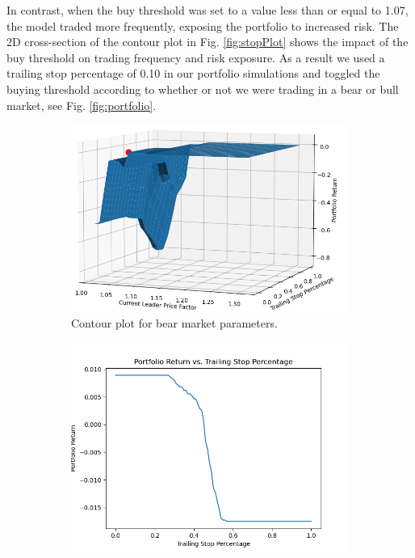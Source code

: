 \documentclass{article}
\begin{document}
In contrast, when the buy threshold was set to a value less than or equal to 1.07, the model traded more frequently, exposing the portfolio to increased risk. The 2D cross-section of the contour plot in Fig. \ref{fig:stopPlot} shows the impact of the buy threshold on trading frequency and risk exposure. As a result we used a trailing stop percentage of 0.10 in our portfolio simulations and toggled the buying threshold according to whether or not we were trading in a bear or bull market, see Fig. \ref{fig:portfolio}.
\begin{figure}[H]
    \centering
    \begin{subfigure}{0.495\textwidth}
        \centering
        \includegraphics[width=\linewidth]{contourPlot.png}
        \caption{Contour plot for bear market parameters.}
        \label{fig:contourPlot}
    \end{subfigure}
    \hfill
    \begin{subfigure}{0.495\textwidth}
        \centering
        \includegraphics[width=\linewidth]{slicePlot.png}

\end{subfigure}
\end{figure}
\end{document}
